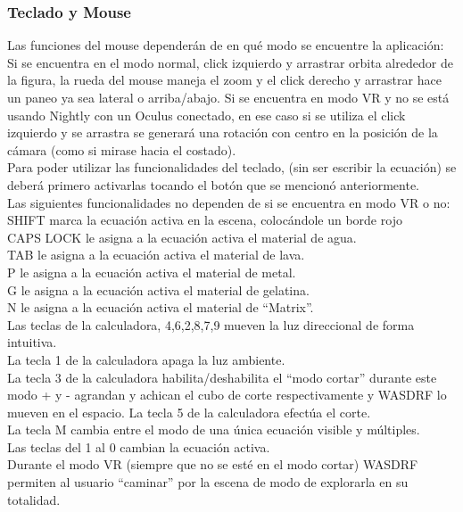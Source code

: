 \documentclass[12pt]{article}
\begin{document}
\subsubsection{Teclado y Mouse}
Las funciones del mouse dependerán de en qué modo se encuentre la aplicación:
Si se encuentra en el modo normal, click izquierdo y arrastrar orbita alrededor de la figura,  la rueda del mouse maneja el zoom y el click derecho y arrastrar hace un paneo ya sea lateral o arriba/abajo.
Si se encuentra en modo VR y no se está usando Nightly con un Oculus conectado, en ese caso si se utiliza el click izquierdo y se arrastra se generará una rotación con centro en la posición de la cámara (como si mirase hacia el costado).
\\Para poder utilizar las funcionalidades del teclado, (sin ser escribir la ecuación) se deberá primero activarlas tocando el botón que se mencionó anteriormente.
\\Las siguientes funcionalidades no dependen de si se encuentra en modo VR o no:
\\SHIFT marca la ecuación activa en la escena, colocándole un borde rojo
\\CAPS LOCK le asigna a la ecuación activa el material de agua.
\\TAB le asigna a la ecuación activa el material de lava.
\\P le asigna a la ecuación activa el material de metal.
\\G le asigna a la ecuación activa el material de gelatina.
\\N le asigna a la ecuación activa el material de “Matrix”.
\\Las teclas de la calculadora, 4,6,2,8,7,9 mueven la luz direccional de forma intuitiva.
\\La tecla 1 de la calculadora apaga la luz ambiente.
\\La tecla 3 de la calculadora habilita/deshabilita el “modo cortar” durante este modo + y - agrandan y achican el cubo de corte respectivamente y WASDRF lo mueven en el espacio. La tecla 5 de la calculadora efectúa el corte.
\\La tecla M cambia entre el modo de una única ecuación visible y múltiples.
\\Las teclas del 1 al 0 cambian la ecuación activa. 
\\Durante el modo VR  (siempre que no se esté en el modo cortar) WASDRF  permiten al usuario “caminar” por la escena de modo de explorarla en su totalidad.
\end{document}
